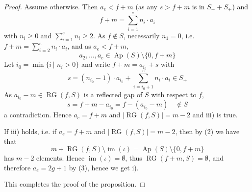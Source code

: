 \documentclass[10pt,a4paper]{amsart}
\begin{document}
\begin{proof}
Assume otherwise. Then $a_e < f+m$ (as any $s > f+m$ is in $S_++S_+$) and 
	$$ f+m = \sum\limits_{i=1}^e n_i \cdot a_i $$
with $n_i \geq 0$ and $\sum\limits_{i=1}^e n_i \geq 2$. As $f \notin S$, 
necessarily $n_1 = 0$, i.e. $ f+m = \sum\limits_{i=2}^e n_i \cdot a_i $, and as 
$a_e < f+m$, 
	$$ a_2, \ldots, a_e \in \operatorname{Ap}(S) \setminus \{0, f+m\} $$ 
Let $i_0 = \operatorname{min}\{i \, \vert \,\, n_i > 0\}$ and write 
	$ f+m = a_{i_0} + s $
with 
	$$ s = \left(n_{i_0}-1\right) \cdot a_{i_0} + \sum\limits_{i=i_0+1}^e n_i \cdot a_i 
	\in S_+ $$
As $a_{i_0} - m \in \operatorname{RG}(f, S)$ 
is a reflected gap of $S$ with respect to $f$,  
	$$ s = f + m - a_{i_0} = f - \left(a_{i_0} - m\right) \quad \notin S $$
a contradiction. Hence $a_e = f+m$ and $\vert \operatorname{RG}(f, S) \vert = m-2$ 
and iii) is true.

If iii) holds, i.e. if $a_e = f+m$ and $\vert \operatorname{RG}(f, S) \vert = m-2$, 
then by (2) we have that 
	$$ m + \operatorname{RG}(f, S) \setminus \operatorname{im}(\iota) 
	= \operatorname{Ap}(S) \setminus \{0, f+m\} $$ 
has $m-2$ elements. Hence $\operatorname{im}(\iota) = \emptyset$, thus 
$\operatorname{RG}(f+m, S) = \emptyset$, and therefore $a_e = 2g+1$ by (3), 
hence we get i). 

This completes the proof of the proposition.  

\end{proof}
\end{document}
